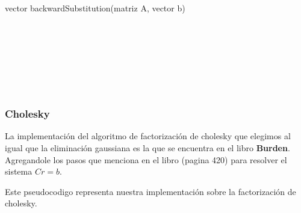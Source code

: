 \begin{algorithm}
    \begin{algorithmic}[1]\parskip=2mm
        \caption{vector backwardSubstitution(matriz A, vector b)}
        \\
        \\
        \\
        \\
        \\
        \\
    \end{algorithmic}
\end{algorithm}


\newpage
\subsubsection{Cholesky}

La implementación del algoritmo de factorizaci\'on de cholesky que elegimos al igual que la eliminaci\'on gaussiana es la que se encuentra en el libro \textbf{Burden}.
Agregandole los pasos que menciona en el libro (pagina 420) para resolver el sistema $Cr$$=$$b$.

Este pseudocodigo representa nuestra implementaci\'on sobre la factorizaci\'on de cholesky.

